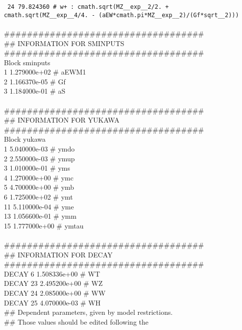 {\texttt{  24 79.824360 \# w+ : cmath.sqrt(MZ\_\_exp\_\_2/2. + cmath.sqrt(MZ\_\_exp\_\_4/4. - (aEW*cmath.pi*MZ\_\_exp\_\_2)/(Gf*sqrt\_\_2)))} \\
\\
\#\#\#\#\#\#\#\#\#\#\#\#\#\#\#\#\#\#\#\#\#\#\#\#\#\#\#\#\#\#\#\#\#\#\#\\
\#\# INFORMATION FOR SMINPUTS\\
\#\#\#\#\#\#\#\#\#\#\#\#\#\#\#\#\#\#\#\#\#\#\#\#\#\#\#\#\#\#\#\#\#\#\#\\
Block sminputs \\
    1 1.279000e+02 \# aEWM1 \\
    2 1.166370e-05 \# Gf \\
    3 1.184000e-01 \# aS \\
\\
\#\#\#\#\#\#\#\#\#\#\#\#\#\#\#\#\#\#\#\#\#\#\#\#\#\#\#\#\#\#\#\#\#\#\#\\
\#\# INFORMATION FOR YUKAWA\\
\#\#\#\#\#\#\#\#\#\#\#\#\#\#\#\#\#\#\#\#\#\#\#\#\#\#\#\#\#\#\#\#\#\#\#\\
Block yukawa \\
    1 5.040000e-03 \# ymdo \\
    2 2.550000e-03 \# ymup \\
    3 1.010000e-01 \# yms \\
    4 1.270000e+00 \# ymc \\
    5 4.700000e+00 \# ymb \\
    6 1.725000e+02 \# ymt \\
   11 5.110000e-04 \# yme \\
   13 1.056600e-01 \# ymm \\
   15 1.777000e+00 \# ymtau \\
\\
\#\#\#\#\#\#\#\#\#\#\#\#\#\#\#\#\#\#\#\#\#\#\#\#\#\#\#\#\#\#\#\#\#\#\#\\
\#\# INFORMATION FOR DECAY\\
\#\#\#\#\#\#\#\#\#\#\#\#\#\#\#\#\#\#\#\#\#\#\#\#\#\#\#\#\#\#\#\#\#\#\#\\
DECAY   6 1.508336e+00 \# WT \\
DECAY  23 2.495200e+00 \# WZ \\
DECAY  24 2.085000e+00 \# WW \\
DECAY  25 4.070000e-03 \# WH \\
\#\# Dependent parameters, given by model restrictions.\\
\#\# Those values should be edited following the \\
}
